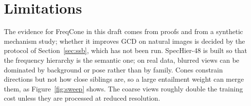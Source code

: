 \documentclass[10pt]{article}
\begin{document}
\section{Limitations}
The evidence for FreqCone in this draft comes from proofs and from a synthetic mechanism study; whether it
improves GCD on natural images is decided by the protocol of Section~\ref{sec:ssb}, which has not been run.
SpecHier-48 is built so that the frequency hierarchy is the semantic one; on real data, blurred views can be
dominated by background or pose rather than by family. Cones constrain directions but not how close siblings
are, so a large entailment weight can merge them, as Figure~\ref{fig:sweep} shows. The coarse views roughly
double the training cost unless they are processed at reduced resolution.
\end{document}
